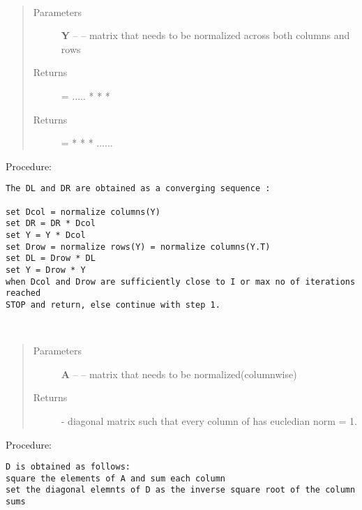\documentclass[letterpaper,10pt,english]{sphinxmanual}
\begin{document}
\begin{fulllineitems}
\label{index:brake.initialize.diagscale.norm_rc}~\begin{quote}\begin{description}
\item[{Parameters}] \leavevmode
\textbf{Y} -- -- matrix that needs to be normalized across both columns and rows

\item[{Returns}] \leavevmode
{} = .....  *  *  * 

\item[{Returns}] \leavevmode
{} =  *  *  * ......

\end{description}\end{quote}

Procedure:

\begin{Verbatim}[commandchars=\\\{\}]
The DL and DR are obtained as a converging sequence :

set Dcol = normalize columns(Y)
set DR = DR * Dcol
set Y = Y * Dcol
set Drow = normalize rows(Y) = normalize columns(Y.T)
set DL = Drow * DL
set Y = Drow * Y
when Dcol and Drow are sufficiently close to I or max no of iterations reached
STOP and return, else continue with step 1.
\end{Verbatim}

\end{fulllineitems}


\begin{fulllineitems}
\label{index:brake.initialize.diagscale.normalize_cols}~\begin{quote}\begin{description}
\item[{Parameters}] \leavevmode
\textbf{A} -- -- matrix that needs to be normalized(columnwise)

\item[{Returns}] \leavevmode
{} - diagonal matrix such that every column of  has eucledian norm = 1.

\end{description}\end{quote}

Procedure:

\begin{Verbatim}[commandchars=\\\{\}]
D is obtained as follows:
square the elements of A and sum each column
set the diagonal elemnts of D as the inverse square root of the column sums
\end{Verbatim}

\end{fulllineitems}
\end{document}
